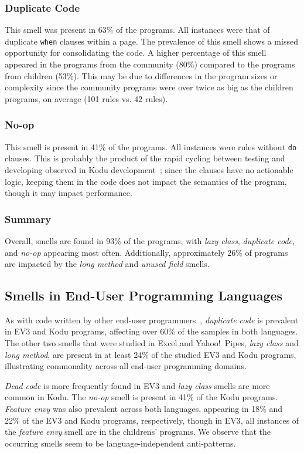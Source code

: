 \documentclass[conference]{IEEEtran}
\begin{document}
\subsubsection{Duplicate Code}
This smell was present in 63\% of the programs. All instances were that of duplicate {\tt when} clauses within a page. The prevalence of this smell shows a missed opportunity for consolidating the code. A higher percentage of this smell appeared in the programs from the community (80\%) compared to the programs from children (53\%). This may be due to differences in the program sizes or complexity since the community programs were over twice as big as the children programs, on average (101 rules vs. 42 rules). 

\subsubsection{No-op}
This  smell is  present in 41\% of the programs. All instances were rules without {\tt do} clauses.  This is probably the product of the rapid cycling between testing and developing observed in Kodu development~\cite{Stolee:2011:ECS:1953163.1953197}; since the clauses have no actionable logic, keeping them in the code does not impact the semantics of the program, though it may impact performance. 

\subsubsection{Summary}
Overall, smells are found in 93\% of the programs, with \emph{lazy class}, \emph{duplicate code},  and \emph{no-op} appearing most often. Additionally, approximately 26\% of programs are impacted by the \emph{long method} and \emph{unused field} smells. 

\subsection{Smells in End-User Programming Languages}


As with code written by other end-user programmers~\cite{StoleeTSE2013}, \emph{duplicate code} is prevalent in EV3 and Kodu programs, affecting over 60\% of the samples in both languages. The other two smells that were studied in Excel and Yahoo!\ Pipes, \emph{lazy class} and \emph{long method}, are present in at least 24\% of the studied EV3 and Kodu programs, illustrating commonality across all end-user programming domains. 

\emph{Dead code} is more frequently found in EV3 and \emph{lazy class} smells are more common in Kodu. The \emph{no-op} smell is present in 41\% of the Kodu programs. \emph{Feature envy} was also prevalent across both languages, appearing in 18\% and 22\% of the EV3 and Kodu programs, respectively, though in EV3, all instances of the \emph{feature envy} smell are in the childrens' programs. 
We observe that the occurring smells seem to be language-independent anti-patterns. 
\end{document}
